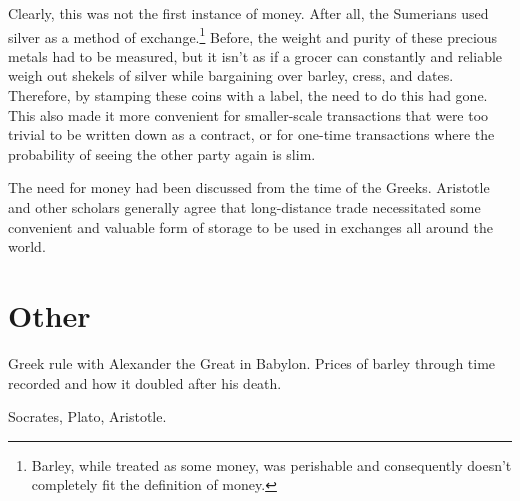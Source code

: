 \documentclass{article}
\begin{document}
    Clearly, this was not the first instance of money. After all, the Sumerians used silver as a method of exchange.\footnote{Barley, while treated as some money, was perishable and consequently doesn't completely fit the definition of money. } Before, the weight and purity of these precious metals had to be measured, but it isn't as if a grocer can constantly and reliable weigh out shekels of silver while bargaining over barley, cress, and dates. Therefore, by stamping these coins with a label, the need to do this had gone. This also made it more convenient for smaller-scale transactions that were too trivial to be written down as a contract, or for one-time transactions where the probability of seeing the other party again is slim. 

    The need for money had been discussed from the time of the Greeks. Aristotle and other scholars generally agree that long-distance trade necessitated some convenient and valuable form of storage to be used in exchanges all around the world. 
 
\section{Other}

  Greek rule with Alexander the Great in Babylon. Prices of barley through time recorded and how it doubled after his death. 

  Socrates, Plato, Aristotle. 
\end{document}
